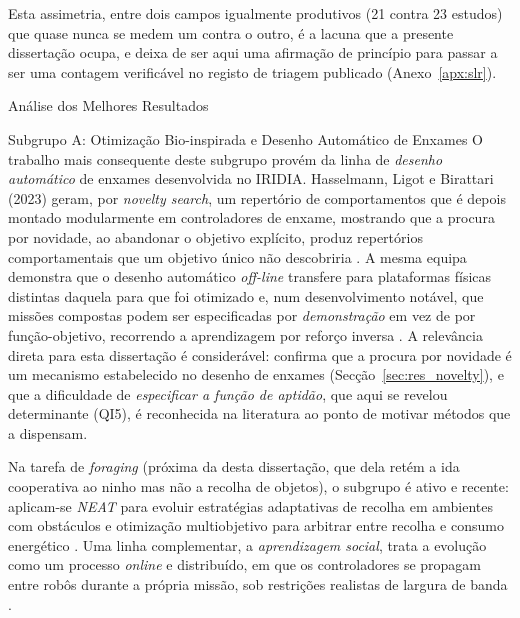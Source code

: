 \documentclass[12pt,reqno, twoside]{amsbook}
\makeatletter
\def\section{\@startsection{section}{1}%
      \z@{.5\linespacing\@plus.7\linespacing}{.25\linespacing}%
      {\normalfont\bfseries\flushleft}}
\def\subsection{\@startsection{subsection}{2}%
      \z@{.5\linespacing\@plus.7\linespacing}{.25\linespacing}%
      {\normalfont\bfseries\flushleft}}
\theoremstyle{plain}
\numberwithin{equation}{chapter}
\numberwithin{section}{chapter}
\numberwithin{table}{chapter}
\numberwithin{figure}{chapter}
\makeatother
\begin{document}
Esta assimetria, entre dois campos igualmente produtivos (21 contra 23 estudos) que quase nunca se medem um contra o outro, é a lacuna que a presente dissertação ocupa, e deixa de ser aqui uma afirmação de princípio para passar a ser uma contagem verificável no registo de triagem publicado (Anexo~\ref{apx:slr}).

\section{Análise dos Melhores Resultados}

\subsection{Subgrupo A: Otimização Bio-inspirada e Desenho Automático de Enxames}
O trabalho mais consequente deste subgrupo provém da linha de \emph{desenho automático} de enxames desenvolvida no IRIDIA. Hasselmann, Ligot e Birattari (2023) geram, por \textit{novelty search}, um repertório de comportamentos que é depois montado modularmente em controladores de enxame, mostrando que a procura por novidade, ao abandonar o objetivo explícito, produz repertórios comportamentais que um objetivo único não descobriria \cite{hasselmann2023novelty}. A mesma equipa demonstra que o desenho automático \textit{off-line} transfere para plataformas físicas distintas daquela para que foi otimizado \cite{kegeleirs2024transfer} e, num desenvolvimento notável, que missões compostas podem ser especificadas por \emph{demonstração} em vez de por função-objetivo, recorrendo a aprendizagem por reforço inversa \cite{szpirer2024composite}. A relevância direta para esta dissertação é considerável: confirma que a procura por novidade é um mecanismo estabelecido no desenho de enxames (Secção~\ref{sec:res_novelty}), e que a dificuldade de \emph{especificar a função de aptidão}, que aqui se revelou determinante (QI5), é reconhecida na literatura ao ponto de motivar métodos que a dispensam.

Na tarefa de \textit{foraging} (próxima da desta dissertação, que dela retém a ida cooperativa ao ninho mas não a recolha de objetos), o subgrupo é ativo e recente: aplicam-se \emph{NEAT} para evoluir estratégias adaptativas de recolha em ambientes com obstáculos \cite{zaman2025neat, biteng2025training} e otimização multiobjetivo para arbitrar entre recolha e consumo energético \cite{ordaz2026foraging}. Uma linha complementar, a \emph{aprendizagem social}, trata a evolução como um processo \emph{online} e distribuído, em que os controladores se propagam entre robôs durante a própria missão, sob restrições realistas de largura de banda \cite{bredeche2022social, fontbonne2020online}.
\end{document}
